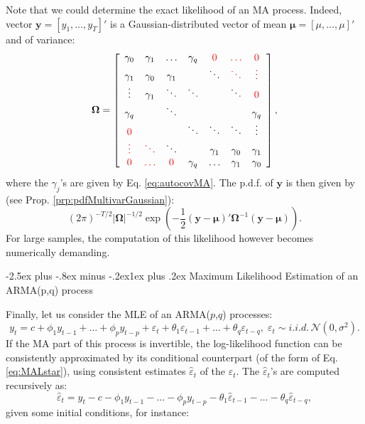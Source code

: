 \documentclass[
  11pt,
]{book}
\makeatletter
\renewcommand\subsection{\@startsection{subsection}{2}{\z@}
  {-2.5ex plus -.8ex minus -.2ex}{1ex plus .2ex}
  {\normalfont\large\bfseries\color{TextbookInk}}}
\theoremstyle{definition}
\theoremstyle{definition}
\theoremstyle{definition}
\theoremstyle{definition}
\theoremstyle{remark}
\makeatother
\begin{document}
Note that we could determine the exact likelihood of an MA process. Indeed, vector \(\mathbf{y} = [y_1,\dots,y_T]'\) is a Gaussian-distributed vector of mean \(\boldsymbol\mu = [\mu,\dots,\mu]'\) and of variance:
\[
\boldsymbol\Omega = \left[\begin{array}{ccccccc}
\gamma_0 & \gamma_1&\dots&\gamma_q&{\color{red}0}&{\color{red}\dots}&{\color{red}0}\\
\gamma_1 & \gamma_0&\gamma_1&&\ddots&{\color{red}\ddots}&{\color{red}\vdots}\\
\vdots & \gamma_1&\ddots&\ddots&&\ddots&{\color{red}0}\\
\gamma_q &&\ddots&&&&\gamma_q\\
{\color{red}0} &&&\ddots&\ddots&\ddots&\vdots\\
{\color{red}\vdots}&{\color{red}\ddots}&\ddots&&\gamma_1&\gamma_0&\gamma_1\\
{\color{red}0}&{\color{red}\dots}&{\color{red}0}&\gamma_q&\dots&\gamma_1&\gamma_0
\end{array}\right],
\]
where the \(\gamma_j\)'s are given by Eq. \eqref{eq:autocovMA}. The p.d.f. of \(\mathbf{y}\) is then given by (see Prop. \ref{prp:pdfMultivarGaussian}):
\[
(2\pi)^{-T/2}|\boldsymbol\Omega|^{-1/2}\exp\left( -\frac{1}{2} (\mathbf{y}-\boldsymbol\mu)' \boldsymbol\Omega^{-1} (\mathbf{y}-\boldsymbol\mu)\right).
\]
For large samples, the computation of this likelihood however becomes numerically demanding.

\subsection{Maximum Likelihood Estimation of an ARMA(p,q) process}\label{estimARMApq}

Finally, let us consider the MLE of an ARMA(\(p\),\(q\)) processes:
\[
y_t = c + \phi_1 y_{t-1} + \dots + \phi_p y_{t-p} + \varepsilon_t + \theta_1 \varepsilon_{t-1} +
\dots + \theta_q \varepsilon_{t-q} , \; \varepsilon_t \sim i.i.d.\,\mathcal{N}(0,\sigma^2).
\]
If the MA part of this process is invertible, the log-likelihood function can be consistently approximated by its conditional counterpart (of the form of Eq. \eqref{eq:MALstar}), using consistent estimates \(\hat\varepsilon_t\) of the \(\varepsilon_t\). The \(\hat\varepsilon_t\)'s are computed recursively as:
\begin{equation}
\hat\varepsilon_t = y_t - c - \phi_1 y_{t-1} - \dots - \phi_p y_{t-p} - \theta_1 \hat\varepsilon_{t-1} - \dots - \theta_q \hat\varepsilon_{t-q},\label{eq:recvareps}
\end{equation}
given some initial conditions, for instance:
\end{document}
